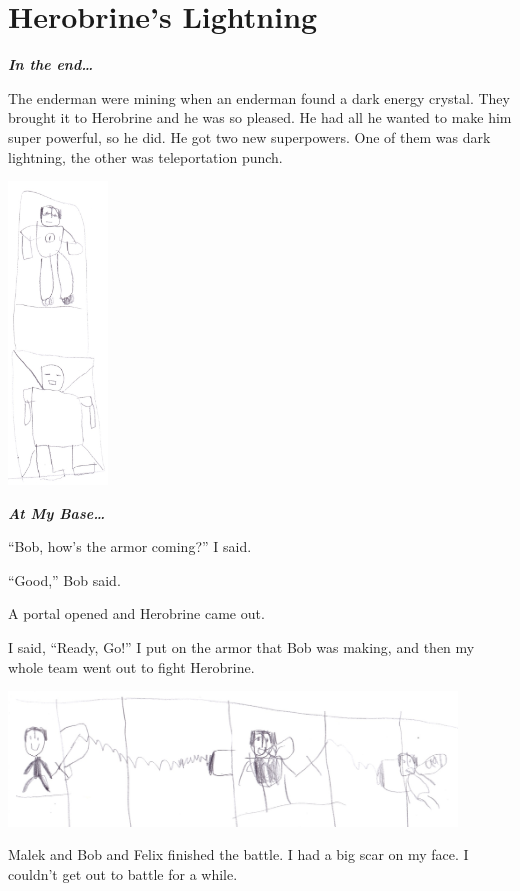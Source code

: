 \documentclass[12pt,oneside]{krantz}
\begin{document}
\hypertarget{herobrines-lightning}{%
\chapter{Herobrine's Lightning}\label{herobrines-lightning}}

\textbf{\emph{In the end\ldots{}}}

The enderman were mining when an enderman found a dark energy crystal.
They brought it to Herobrine and he was so pleased. He had all he wanted
to make him super powerful, so he did. He got two new superpowers. One
of them was dark lightning, the other was teleportation punch.

\includegraphics[width=1.04167in,height=\textheight]{img/final-war/dark-lightning.jpg}

\textbf{\emph{At My Base\ldots{}}}

``Bob, how's the armor coming?'' I said.

``Good,'' Bob said.

A portal opened and Herobrine came out.

I said, ``Ready, Go!'' I put on the armor that Bob was making, and then
my whole team went out to fight Herobrine.

\includegraphics[width=4.6875in,height=\textheight]{img/final-war/bob.jpg}

Malek and Bob and Felix finished the battle. I had a big scar on my
face. I couldn't get out to battle for a while.
\end{document}
